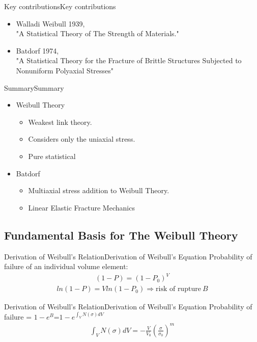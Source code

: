 \documentclass{beamer}
\begin{document}
\begin{frame}{Key contributions}{Key contributions}
\begin{itemize}
\item{Walladi Weibull 1939,\\"A Statistical Theory of The Strength of Materials."}
\item<1->{Batdorf 1974,\\"A Statistical Theory for the Fracture of Brittle Structures Subjected to Nonuniform Polyaxial Stresses"}
\end{itemize} 
\end{frame}

\begin{frame}{Summary}{Summary}
\begin{itemize}
\item Weibull Theory
    \begin{itemize}
	\item Weakest link theory.
	\item Considers only the uniaxial stress.
	\item Pure statistical
	\end{itemize}
\item<2-> Batdorf
 \begin{itemize}
	\item Multiaxial stress addition to Weibull Theory.
	\item Linear Elastic Fracture Mechanics
\end{itemize}
\end{itemize} 
\end{frame}

\subsection[Fundamental Basis for The Weibull Theory]{Fundamental Basis for The Weibull Theory}
\begin{frame}{Derivation of Weibull's Relation}{Derivation of Weibull's Equation}
Probability of failure of an individual volume element:
\begin{eqnarray*}
(1-P)=(1-P_0)^V
\end{eqnarray*}
\begin{eqnarray*}
ln(1-P)=V ln(1-P_0)\Longrightarrow \text{risk of rupture} \ B
\end{eqnarray*}
\end{frame}
\begin{frame}{Derivation of Weibull's Relation}{Derivation of Weibull's Equation}
Probability of failure = $1-e^B$=$1-e^{\int_{V} N\left(\sigma\right)dV}$
\begin{eqnarray*}
\int_{V} N\left(\sigma\right)dV=-\frac{V}{V_0}\left(\frac{\sigma}{\sigma_0}\right)^m
\end{eqnarray*}
\end{frame}
\end{document}
